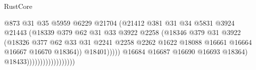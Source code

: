 \begin{lexlean}{RustCore}
\begin{coremodule}
                                                @873
                                                @31
                                                @35
                                                @5959
                                                @6229
                                                @21704
                                                (@21412
                                                  @381
                                                  @31
                                                  @34
                                                  @5831
                                                  @3924
                                                  @21443
                                                  (@18339
                                                    @379
                                                    @62
                                                    @31
                                                    @33
                                                    @3922
                                                    @2258
                                                    (@18346
                                                      @379
                                                      @31
                                                      @3922
                                                      (@18326
                                                        @377
                                                        @62
                                                        @33
                                                        @31
                                                        @2241
                                                        @2258
                                                        @2262
                                                        @1622
                                                        @18088
                                                        @16661
                                                        @16664
                                                        @16667
                                                        @16670
                                                        @18364))
                                                    @18401)))))
                                          @16684
                                          @16687
                                          @16690
                                          @16693
                                          @18364)
                                        @18433))))))))))))))))))

\end{coremodule}
\end{lexlean}
